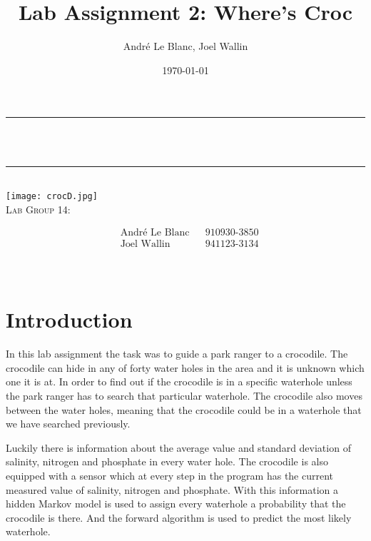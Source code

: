 \documentclass[12pt, a4paper]{article}
\title{Lab Assignment 2: Where’s Croc}	%
\author{André Le Blanc, Joel Wallin}
\date{\today}
\makeatletter
\let\thetitle\@title
\makeatother
\begin{document}
\begin{titlepage}
	\centering
    \vspace*{0.5 cm}
	\rule{\linewidth}{0.2 mm} \\[0.4 cm]
	{ \huge \bfseries \thetitle}\\  
	\rule{\linewidth}{0.2 mm} \\[1.5 cm]
    \texttt{[image: crocD.jpg]}\\[0.5 cm]
    
    \textsc{\Large Lab Group 14:}\\[0.5 cm]
	\begin{minipage}{0.4\textwidth}  
    \begin{align*}
	&\text{André Le Blanc}    &&\text{910930-3850}\\
	&\text{Joel Wallin}  &&\text{941123-3134}\\
	\end{align*}
	\end{minipage}\\[2 cm]
\end{titlepage}


\newpage
\tableofcontents
\newpage

\section{Introduction}

In this lab assignment the task was to guide a park ranger to a crocodile. The crocodile can hide in any of forty water holes in the area and it is unknown which one it is at. In order to find out if the crocodile is in a specific waterhole unless the park ranger has to search that particular waterhole. The crocodile also moves between the water holes, meaning that the crocodile could be in a waterhole that we have searched previously. 

Luckily there is information about the average value and standard deviation of salinity, nitrogen and phosphate in every water hole. The crocodile is also equipped with a sensor which at every step in the program has the current measured value of salinity, nitrogen and phosphate. With this information a hidden Markov model is used to assign every waterhole a probability that the crocodile is there. And the forward algorithm is used to predict the most likely waterhole.
\end{document}
